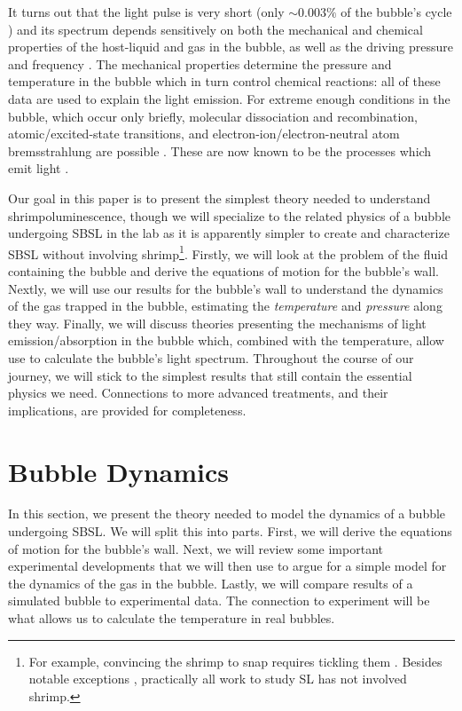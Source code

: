 \documentclass[11pt,prb,aps,nofootinbib,superscriptaddress,floatfix]{revtex4-2}
\begin{document}
It turns out that the light pulse is very short (only $\sim0.003\%$ of the bubble's cycle \cite{suslick2008inside}) and its spectrum depends sensitively on both the mechanical and chemical properties of the host-liquid and gas in the bubble, as well as the driving pressure and frequency \cite{brenner2002single,suslick2008inside}. The mechanical properties determine the pressure and temperature in the bubble which in turn control chemical reactions: all of these data are used to explain the light emission. For extreme enough conditions in the bubble, which occur only briefly, molecular dissociation and recombination, atomic/excited-state transitions, and electron-ion/electron-neutral atom bremsstrahlung are possible \cite{an2009diagnosing,an2008spectral,an2006mechanism,flannigan2005plasma,suslick2008inside,flannigan2006measurement}. These are now known to be the processes which emit light \cite{lohse2018bubble,yasui2018acoustic}.

Our goal in this paper is to present the simplest theory needed to understand shrimpoluminescence, though we will specialize to the related physics of a bubble undergoing SBSL in the lab as it is apparently simpler to create and characterize SBSL without involving shrimp\footnote{For example, convincing the shrimp to snap requires tickling them \cite{lohse2001snapping,versluis2000snapping,lohse2018bubble}. Besides notable exceptions \cite{tang2019bioinspired}, practically all work to study SL has not involved shrimp.}. Firstly, we will look at the problem of the fluid containing the bubble and derive the equations of motion for the bubble's wall. Nextly, we will use our results for the bubble's wall to understand the dynamics of the gas trapped in the bubble, estimating the \emph{temperature} and \emph{pressure} along they way. Finally, we will discuss theories presenting the mechanisms of light emission/absorption in the bubble which, combined with the temperature, allow use to calculate the bubble's light spectrum. Throughout the course of our journey, we will stick to the simplest results that still contain the essential physics we need. Connections to more advanced treatments, and their implications, are provided for completeness.

\section{Bubble Dynamics}
In this section, we present the theory needed to model the dynamics of a bubble undergoing SBSL. We will split this into parts. First, we will derive the equations of motion for the bubble's wall. Next, we will review some important experimental developments that we will then use to argue for a simple model for the dynamics of the gas in the bubble. Lastly, we will compare results of a simulated bubble to experimental data. The connection to experiment will be what allows us to calculate the temperature in real bubbles.
\end{document}
